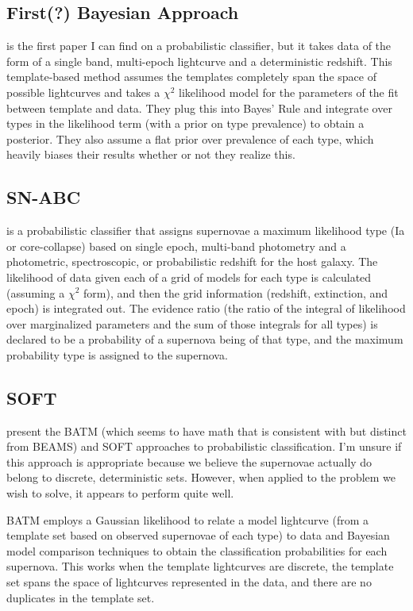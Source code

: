\documentclass[12pt, onecolumn]{emulateapj}
\begin{document}
\subsection{First(?) Bayesian Approach}

\citet{Kuznetsova06} is the first paper I can find on a probabilistic classifier, but it takes data of the form of a single band, multi-epoch lightcurve and a deterministic redshift.  This template-based method assumes the templates completely span the space of possible lightcurves and takes a $\chi^{2}$ likelihood model for the parameters of the fit between template and data.  They plug this into Bayes' Rule and integrate over types in the likelihood term (with a prior on type prevalence) to obtain a posterior.  They also assume a flat prior over prevalence of each type, which heavily biases their results whether or not they realize this.

\subsection{SN-ABC}

\citet{Poznanski06} is a probabilistic classifier that assigns supernovae a maximum likelihood type (Ia or core-collapse) based on single epoch, multi-band photometry and a photometric, spectroscopic, or probabilistic redshift for the host galaxy.  The likelihood of data given each of a grid of models for each type is calculated (assuming a $\chi^{2}$ form), and then the grid information (redshift, extinction, and epoch) is integrated out.  The evidence ratio (the ratio of the integral of likelihood over marginalized parameters and the sum of those integrals for all types) is declared to be a probability of a supernova being of that type, and the maximum probability type is assigned to the supernova.

\subsection{SOFT}

\citet{Rodney09, Rodney10} present the BATM (which seems to have math that is consistent with but distinct from BEAMS) and SOFT approaches to probabilistic classification.  I'm unsure if this approach is appropriate because we believe the supernovae actually do belong to discrete, deterministic sets.  However, when applied to the problem we wish to solve, it appears to perform quite well.

BATM employs a Gaussian likelihood to relate a model lightcurve (from a template set based on observed supernovae of each type) to data and Bayesian model comparison techniques to obtain the classification probabilities for each supernova.  This works when the template lightcurves are discrete, the template set spans the space of lightcurves represented in the data, and there are no duplicates in the template set.  
\end{document}
